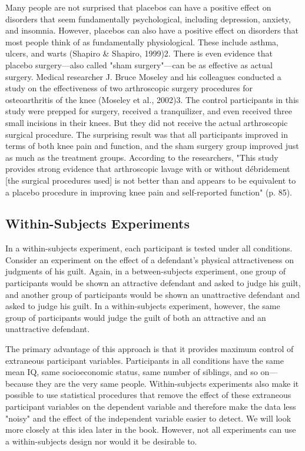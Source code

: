 \color{fgcolor}\begin{kframe}

Many people are not surprised that placebos can have a positive effect on disorders that seem fundamentally psychological, including depression, anxiety, and insomnia. However, placebos can also have a positive effect on disorders that most people think of as fundamentally physiological. These include asthma, ulcers, and warts (Shapiro \& Shapiro, 1999)2. There is even evidence that placebo surgery---also called "sham surgery"---can be as effective as actual surgery.
Medical researcher J. Bruce Moseley and his colleagues conducted a study on the effectiveness of two arthroscopic surgery procedures for osteoarthritis of the knee (Moseley et al., 2002)3. The control participants in this study were prepped for surgery, received a tranquilizer, and even received three small
 incisions in their knees. But they did not receive the actual arthroscopic surgical procedure. The surprising result was that all participants improved in terms of both knee pain and function, and the sham surgery group improved just as much as the treatment groups. According to the researchers, "This study provides strong evidence that arthroscopic lavage with or without débridement [the surgical procedures used] is not better than and appears to be equivalent to a placebo procedure in improving knee pain and self-reported function" (p. 85).
\end{kframe}

\subsection{Within-Subjects Experiments}

In a within-subjects experiment, each participant is tested under all conditions. Consider an experiment on the effect of a defendant's physical attractiveness on judgments of his guilt. Again, in a between-subjects experiment, one group of participants would be shown an attractive defendant and asked to judge his guilt, and another group of participants would be shown an unattractive defendant and asked to judge his guilt. In a within-subjects experiment, however, the same group of participants would judge the guilt of both an attractive and an unattractive defendant.

The primary advantage of this approach is that it provides maximum control of extraneous participant variables. Participants in all conditions have the same mean IQ, same socioeconomic status, same number of siblings, and so on---because they are the very same people. Within-subjects experiments also make it possible to use statistical procedures that remove the effect of these extraneous participant variables on the dependent variable and therefore make the data less "noisy" and the effect of the independent variable easier to detect. We will look more closely at this idea later in the book. However, not all experiments can use a within-subjects design nor would it be desirable to.

